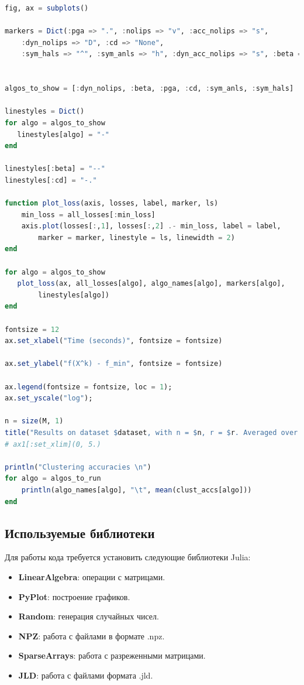 \documentclass[a4paper,11pt]{article}
\begin{document}
\begin{lstlisting}[language=Julia, caption={Графики и анализ}, label={lst:example4}]
fig, ax = subplots()

markers = Dict(:pga => ".", :nolips => "v", :acc_nolips => "s",
    :dyn_nolips => "D", :cd => "None",
    :sym_hals => "^", :sym_anls => "h", :dyn_acc_nolips => "s", :beta => "None")


algos_to_show = [:dyn_nolips, :beta, :pga, :cd, :sym_anls, :sym_hals]

linestyles = Dict()
for algo = algos_to_show
   linestyles[algo] = "-" 
end

linestyles[:beta] = "--"
linestyles[:cd] = "-."

function plot_loss(axis, losses, label, marker, ls)
    min_loss = all_losses[:min_loss]
    axis.plot(losses[:,1], losses[:,2] .- min_loss, label = label,
        marker = marker, linestyle = ls, linewidth = 2)
end

for algo = algos_to_show
   plot_loss(ax, all_losses[algo], algo_names[algo], markers[algo],
        linestyles[algo]) 
end

fontsize = 12
ax.set_xlabel("Time (seconds)", fontsize = fontsize)

ax.set_ylabel("f(X^k) - f_min", fontsize = fontsize)

ax.legend(fontsize = fontsize, loc = 1);
ax.set_yscale("log");

n = size(M, 1)
title("Results on dataset $dataset, with n = $n, r = $r. Averaged over $n_runs runs")
# ax1[:set_xlim](0, 5.)

println("Clustering accuracies \n")
for algo = algos_to_run
    println(algo_names[algo], "\t", mean(clust_accs[algo]))
end
\end{lstlisting}

\subsection{Используемые библиотеки}
Для работы кода требуется установить следующие библиотеки Julia:
\begin{itemize}
    \item \textbf{LinearAlgebra}: операции с матрицами.
    \item \textbf{PyPlot}: построение графиков.
    \item \textbf{Random}: генерация случайных чисел.
    \item \textbf{NPZ}: работа с файлами в формате .npz.
    \item \textbf{SparseArrays}: работа с разреженными матрицами.
    \item \textbf{JLD}: работа с файлами формата .jld.
\end{itemize}
\end{document}
